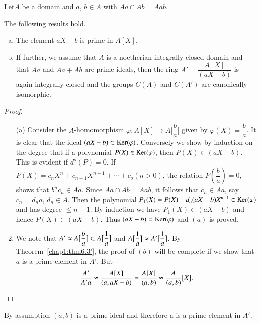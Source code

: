 \begin{prop} %
Let\pageoriginale $A$ be a domain and $a$, $b \in A$ with $Aa \cap Ab
= Aab$. 
\end{prop}  
  
\noindent
The following results hold.
\begin{enumerate}[(a)]
\item The element $aX-b$ is prime in $A[X]$. 

\item If further, we assume that $A$ is a noetherian
  integrally closed domain and that $Aa$ and $Aa + Ab$ are prime
  ideals, then the ring $A' = \dfrac{A[X]}{(a X-b)}$ is again
  integrally closed and the groups $C(A)$ and $C(A')$ are canonically
  isomorphic. 
 \end{enumerate}  

\begin{proof}
\begin{enumerate}
\item[(a)] Consider the $A$-homomorphism $\varphi : A [X] \rightarrow
  A \big[\dfrac{b}{a} \big]$ given by $\varphi(X) = \dfrac{b}{a}$. It
  is clear that the ideal $(a X -b) \subset \operatorname{Ker} (\varphi)$. Conversely
  we show by induction on the degree that if a polynomial $P(X) \in
  \operatorname{Ker} (\varphi)$, then $P(X) \in (a X-b)$. This is evident if $d^o (P)
  = 0$. If $P(X) = c_n X^n + c_{n-1} X^{n-1} + \cdots + c_o (n > 0)$,
  the relation $P(\dfrac{b}{a}) = 0$, shows that $b^n c_n \in
  Aa$. Since $Aa \cap Ab = Aab$, it follows that $c_n \in Aa$, say
  $c_n = d_n a$, $d_n \in A$. Then the polynomial $P_1(X) = P(X) - d_n (a
  X-b) X^{n-1} \in \operatorname{Ker} (\varphi)$ and has degree $\le n - 1$. By
  induction we have $P_1(X) \in (a X -b)$ and hence $P(X) \in (a
  X-b)$. Thus $(a X-b) = \operatorname{Ker} (\varphi)$ and $(a)$ is proved. 

\item We note that $A' \thickapprox A \big[ \dfrac{b}{a}\big] \subset
  A \big[\dfrac{1}{a}\big ] $ and $A \big[ \dfrac{1}{a}\big]
  \thickapprox A' \big[ \dfrac{1}{a}\big]$. By 
Theorem~\ref{chap1:thm6.3'}, the 
  proof of $(b)$ will be complete if we show that $a$ is a prime element
  in $A'$. But 
$$
\dfrac{A'}{A' a} \thickapprox \dfrac{A[X]}{(a, a X-b)} =  
\dfrac{A[X]}{(a, b)} \thickapprox \dfrac{A}{(a, b)} \big [ X \big]. 
$$
\end{enumerate}
  \end{proof}  
  
\noindent
By assumption $(a, b)$ is a prime ideal and therefore a is a prime
element in $A'$.\pageoriginale 

